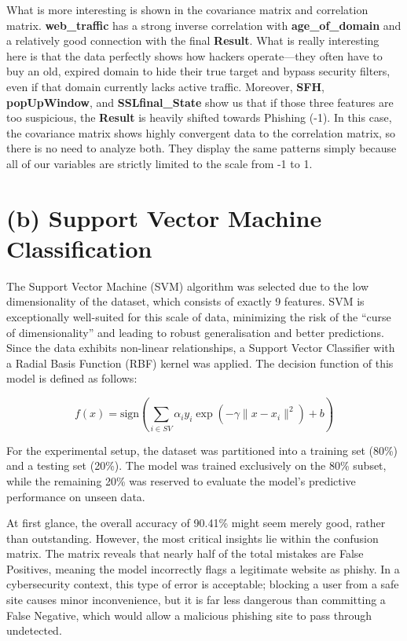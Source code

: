 \documentclass[12pt,a4paper]{article}
\begin{document}
	What is more interesting is shown in the covariance matrix and correlation matrix. \textbf{web\_traffic} has a strong inverse correlation with \textbf{age\_of\_domain} and a relatively good connection with the final \textbf{Result}. What is really interesting here is that the data perfectly shows how hackers operate—they often have to buy an old, expired domain to hide their true target and bypass security filters, even if that domain currently lacks active traffic. Moreover, \textbf{SFH}, \textbf{popUpWindow}, and \textbf{SSLfinal\_State} show us that if those three features are too suspicious, the \textbf{Result} is heavily shifted towards Phishing (-1). In this case, the covariance matrix shows highly convergent data to the correlation matrix, so there is no need to analyze both. They display the same patterns simply because all of our variables are strictly limited to the scale from -1 to 1.
	
	\section{(b) Support Vector Machine Classification}
	The Support Vector Machine (SVM) algorithm was selected due to the low dimensionality of the dataset, which consists of exactly 9 features. SVM is exceptionally well-suited for this scale of data, minimizing the risk of the ``curse of dimensionality'' and leading to robust generalisation and better predictions. Since the data exhibits non-linear relationships, a Support Vector Classifier with a Radial Basis Function (RBF) kernel was applied. The decision function of this model is defined as follows:
	
	\begin{equation}
		f(x) = \text{sign} \left( \sum_{i \in SV} \alpha_i y_i \exp(-\gamma \|x - x_i\|^2) + b \right)
		\label{eq:svm_rbf}
	\end{equation}
	
	For the experimental setup, the dataset was partitioned into a training set (80\%) and a testing set (20\%). The model was trained exclusively on the 80\% subset, while the remaining 20\% was reserved to evaluate the model's predictive performance on unseen data.
	
	At first glance, the overall accuracy of 90.41\% might seem merely good, rather than outstanding. However, the most critical insights lie within the confusion matrix. The matrix reveals that nearly half of the total mistakes are False Positives, meaning the model incorrectly flags a legitimate website as phishy. In a cybersecurity context, this type of error is acceptable; blocking a user from a safe site causes minor inconvenience, but it is far less dangerous than committing a False Negative, which would allow a malicious phishing site to pass through undetected.
	
\end{document}
